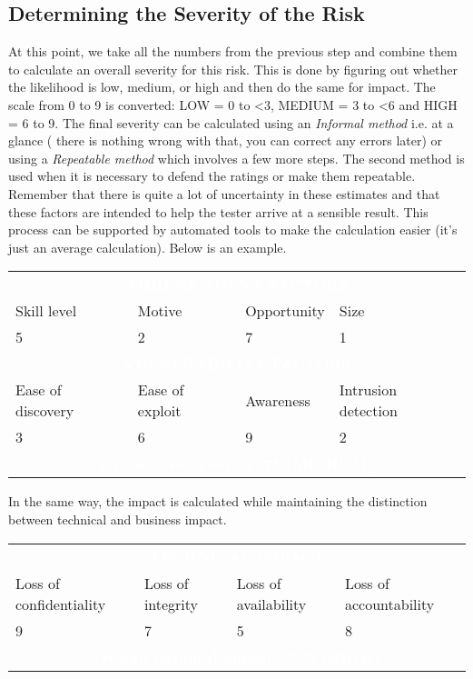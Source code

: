 \subsection{Determining the Severity of the Risk}
At this point, we take all the numbers from the previous step and combine them to calculate an overall severity for this risk. This is done by figuring out whether the likelihood is low, medium, or high and then do the same for impact. The scale from 0 to 9 is converted: LOW = 0 to <3, MEDIUM = 3 to <6 and HIGH = 6 to 9. The final severity can be calculated using an \textit{Informal method} i.e. at a glance ( there is nothing wrong with that, you can correct any errors later) or using a \textit {Repeatable method} which involves a few more steps. The second method is used when it is necessary to defend the ratings or make them repeatable. Remember that there is quite a lot of uncertainty in these estimates and that these factors are intended to help the tester arrive at a sensible result. This process can be supported by automated tools to make the calculation easier (it's just an average calculation). Below is an example.
\begin{table}[H]
\centering
\begin{tabularx}{\textwidth}{|X|X|X|X|}
    \hline
    \multicolumn{4}{|c|}{{\cellcolor{dummy-cyan}}\textbf{\textcolor{white}{THREAT AGENT FACTORS}}}\\
    Skill level & Motive & Opportunity & Size\\
    \hline
    5 & 2 & 7 & 1\\
    \hline
    \multicolumn{4}{c|}{{\cellcolor{dummy-cyan}}\textbf{\textcolor{white}{VULNERABILITY FACTORS}}}\\
    \hline
    Ease of discovery & Ease of exploit & Awareness & Intrusion detection\\
    \hline
    3 & 6 & 9 & 2\\
    \hline
    \multicolumn{4}{|c|}{{\cellcolor{dummy-cyan}}\textbf{\textcolor{white}{Overall likelihood=4.375 (MEDIUM)}}}\\
    \hline
\end{tabularx}
\end{table}
\noindent
In the same way, the impact is calculated while maintaining the distinction between technical and business impact.
\begin{table}[H]
\centering
\begin{tabularx}{\textwidth}{|X|X|X|X|}
    \hline
    \multicolumn{4}{|c|}{{\cellcolor{dummy-cyan}}\textbf{\textcolor{white}{TECHNICAL IMPACT}}}\\
    Loss of confidentiality & Loss of integrity & Loss of availability & Loss of accountability\\
    \hline
    9 & 7 & 5 & 8\\
    \hline
    \multicolumn{4}{c|}{{\cellcolor{dummy-cyan}}\textbf{\textcolor{white}{Overall technical impact=7.25 (HIGH)}}}\\
    \hline
\end{tabularx}
\end{table}
